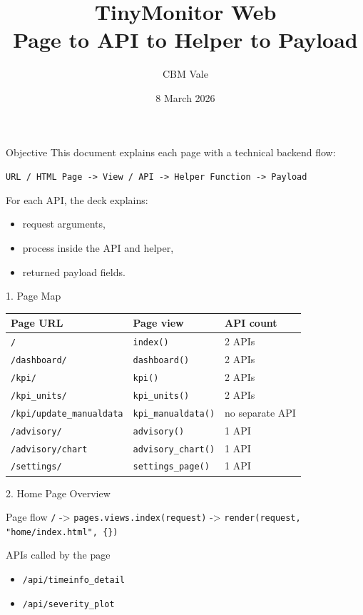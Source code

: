 \documentclass[aspectratio=169]{beamer}
\title{TinyMonitor Web\\Page to API to Helper to Payload}
\author{CBM Vale}
\date{8 March 2026}
\begin{document}
\begin{frame}
  \titlepage
\end{frame}

\begin{frame}{Objective}
\justifying
This document explains each page with a technical backend flow:

\begin{center}
\texttt{URL / HTML Page -> View / API -> Helper Function -> Payload}
\end{center}

For each API, the deck explains:
\begin{itemize}
    \item request arguments,
    \item process inside the API and helper,
    \item returned payload fields.
\end{itemize}
\end{frame}

\begin{frame}{1. Page Map}
\small
\centering
\begin{tabular}{lll}
\toprule
Page URL & Page view & API count \\
\midrule
\texttt{/} & \texttt{index()} & 2 APIs \\
\texttt{/dashboard/} & \texttt{dashboard()} & 2 APIs \\
\texttt{/kpi/} & \texttt{kpi()} & 2 APIs \\
\texttt{/kpi\_units/} & \texttt{kpi\_units()} & 2 APIs \\
\texttt{/kpi/update\_manualdata} & \texttt{kpi\_manualdata()} & no separate API \\
\texttt{/advisory/} & \texttt{advisory()} & 1 API \\
\texttt{/advisory/chart} & \texttt{advisory\_chart()} & 1 API \\
\texttt{/settings/} & \texttt{settings\_page()} & 1 API \\
\bottomrule
\end{tabular}
\end{frame}

\begin{frame}{2. Home Page Overview}
\justifying
\begin{block}{Page flow}
\texttt{/} -> \texttt{pages.views.index(request)} ->
\texttt{render(request, "home/index.html", \{\})}
\end{block}

\begin{block}{APIs called by the page}
\begin{itemize}
    \item \texttt{/api/timeinfo\_detail}
    \item \texttt{/api/severity\_plot}
\end{itemize}
\end{block}
\end{frame}
\end{document}
